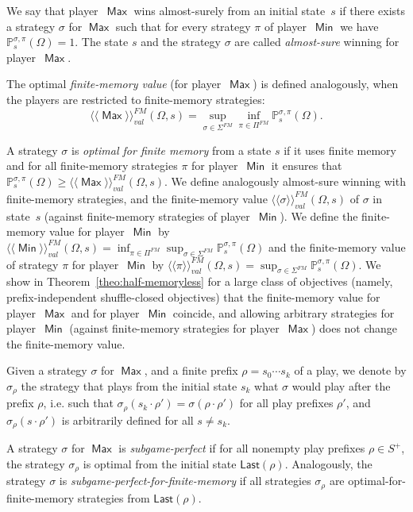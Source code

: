 \documentclass{article}
\newcommand{\Last}{\mathsf{Last}}
\newcommand{\winval}[1]{\langle \! \langle #1 \rangle\! \rangle_{\mathit{val}} }
\newcommand{\vaf}{\winval{\ma}^{{FM}}}
\newcommand{\vbf}{\winval{\mi}^{{FM}}}
\newcommand{\straavaf}{\winval{\straa}^{{FM}}}
\newcommand{\strabvbf}{\winval{\strab}^{{FM}}}
\newcommand{\straa}{\sigma}
\newcommand{\Straa}{\Sigma}
\newcommand{\strab}{\pi}
\newcommand{\Strab}{\Pi}
\DeclareMathOperator{\ma}{\mathsf{Max}}
\DeclareMathOperator{\mi}{\mathsf{Min}}
\newcommand{\prob}[1]{\mathbb{P}_{#1}}
\begin{document}
We say that player~$\ma$ wins almost-surely from an initial state~$s$ if there exists a strategy $\straa$ for $\ma$ such that for every strategy
$\strab$ of player~$\mi$ we have $\mathbb{P}^{\straa,\strab}_{s}(\Omega)=1$.
The state $s$ and the strategy $\straa$ are called \emph{almost-sure} winning for player~$\ma$.

\smallskip{}
The optimal \emph{finite-memory value} (for player~$\ma$) is defined analogously, 
when the players are restricted to finite-memory strategies:
$$\vaf(\Omega,s) = \sup_{\straa \in \Straa^{FM}} \inf_{\strab \in \Strab^{FM}} \prob{s}^{\straa,\strab}(\Omega).$$


A strategy $\straa$ is \emph{optimal for finite memory} from a state $s$
if it uses finite memory and for all finite-memory strategies $\strab$ for player~$\mi$ it ensures that 
$\prob{s}^{\straa,\strab}(\Omega) \geq \vaf(\Omega,s)$.
We define analogously almost-sure winning with finite-memory strategies,
and the finite-memory value $\straavaf(\Omega,s)$ of $\straa$ in state~$s$
(against finite-memory strategies of player~$\mi$). 
We define the finite-memory value for player~$\mi$ by 
$\vbf(\Omega,s) = \inf_{\strab \in \Strab^{FM}} \sup_{\straa \in \Straa^{FM}} \prob{s}^{\straa,\strab}(\Omega)$
and the finite-memory value of strategy $\strab$ for player~$\mi$ by 
$\strabvbf(\Omega,s) = \sup_{\straa \in \Straa^{FM}} \prob{s}^{\straa,\strab}(\Omega)$.
We show in Theorem~\ref{theo:half-memoryless} for a large class of objectives 
(namely, prefix-independent shuffle-closed objectives) that 
the finite-memory value for player~$\ma$ and for player~$\mi$ coincide,
and allowing arbitrary strategies for player~$\mi$ (against finite-memory 
strategies for player~$\ma$) does not change the finite-memory value.







\smallskip{}
Given a strategy $\straa$ for $\ma$, and a finite prefix $\rho = s_0 \cdots s_k$ 
of a play, we denote by $\straa_{\rho}$ the strategy that plays from the initial 
state $s_k$ what $\straa$ would play after the prefix $\rho$, i.e. such that
$\straa_{\rho}(s_k \cdot \rho') = \straa(\rho \cdot \rho')$ for all play prefixes $\rho'$, 
and $\straa_{\rho}(s \cdot \rho')$ is arbitrarily defined for all $s \neq s_k$.

A strategy $\straa$ for $\ma$ is \emph{subgame-perfect} if for all nonempty play 
prefixes $\rho \in S^+$, the strategy $\straa_{\rho}$ is optimal from the initial 
state $\Last(\rho)$.
Analogously, the strategy $\straa$ is \emph{subgame-perfect-for-finite-memory}
if all strategies $\straa_{\rho}$ are optimal-for-finite-memory strategies 
from $\Last(\rho)$.
\end{document}
